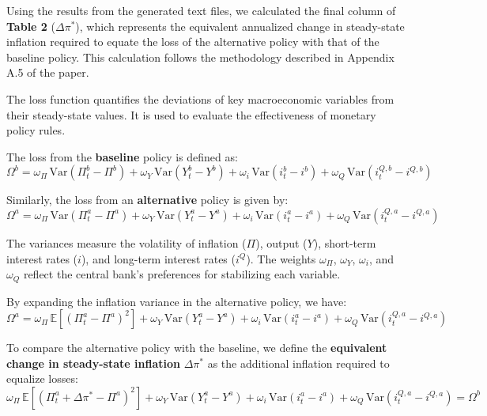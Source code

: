 \documentclass[12pt]{article}
\begin{document}
Using the results from the generated text files, we calculated the final column of \textbf{Table 2} (\(\Delta \pi^*\)), which represents the equivalent annualized change in steady-state inflation required to equate the loss of the alternative policy with that of the baseline policy. This calculation follows the methodology described in Appendix A.5 of the paper.


The loss function quantifies the deviations of key macroeconomic variables from their steady-state values. It is used to evaluate the effectiveness of monetary policy rules.

The loss from the \textbf{baseline} policy is defined as:
\begin{equation}
\Omega^b = \omega_\Pi \, \text{Var}(\Pi_t^b - \Pi^b) + \omega_Y \, \text{Var}(Y_t^b - Y^b) + \omega_i \, \text{Var}(i_t^b - i^b) + \omega_Q \, \text{Var}(i_t^{Q,b} - i^{Q,b}) \tag{A.37}
\end{equation}

Similarly, the loss from an \textbf{alternative} policy is given by:
\begin{equation}
\Omega^a = \omega_\Pi \, \text{Var}(\Pi_t^a - \Pi^a) + \omega_Y \, \text{Var}(Y_t^a - Y^a) + \omega_i \, \text{Var}(i_t^a - i^a) + \omega_Q \, \text{Var}(i_t^{Q,a} - i^{Q,a}) \tag{A.38}
\end{equation}

The variances measure the volatility of inflation ($\Pi$), output ($Y$), short-term interest rates ($i$), and long-term interest rates ($i^Q$). The weights $\omega_\Pi$, $\omega_Y$, $\omega_i$, and $\omega_Q$ reflect the central bank's preferences for stabilizing each variable.

By expanding the inflation variance in the alternative policy, we have:
\begin{equation}
\Omega^a = \omega_\Pi \, \mathbb{E}[(\Pi_t^a - \Pi^a)^2] + \omega_Y \, \text{Var}(Y_t^a - Y^a) + \omega_i \, \text{Var}(i_t^a - i^a) + \omega_Q \, \text{Var}(i_t^{Q,a} - i^{Q,a}) \tag{A.39}
\end{equation}

To compare the alternative policy with the baseline, we define the \textbf{equivalent change in steady-state inflation} $\Delta \pi^*$ as the additional inflation required to equalize losses:
\begin{equation}
\omega_\Pi \, \mathbb{E}[(\Pi_t^a + \Delta \pi^* - \Pi^a)^2] + \omega_Y \, \text{Var}(Y_t^a - Y^a) + \omega_i \, \text{Var}(i_t^a - i^a) + \omega_Q \, \text{Var}(i_t^{Q,a} - i^{Q,a}) = \Omega^b \tag{A.40}
\end{equation}
\end{document}
